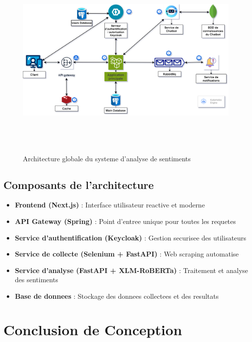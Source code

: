\begin{figure}[H]
\centering
\includegraphics[height=10cm , width=\textwidth]{assets/images/architecture.png}
\caption{Architecture globale du systeme d'analyse de sentiments}
\label{fig:architecture}
\end{figure}

\subsection{Composants de l'architecture}

\begin{itemize}
    \item \textbf{Frontend (Next.js)} : Interface utilisateur reactive et moderne
    \item \textbf{API Gateway (Spring)} : Point d'entree unique pour toutes les requetes
    \item \textbf{Service d'authentification (Keycloak)} : Gestion securisee des utilisateurs
    \item \textbf{Service de collecte (Selenium + FastAPI)} : Web scraping automatise
    \item \textbf{Service d'analyse (FastAPI + XLM-RoBERTa)} : Traitement et analyse des sentiments
    \item \textbf{Base de donnees} : Stockage des donnees collectees et des resultats
\end{itemize}

\section{Conclusion de Conception}

